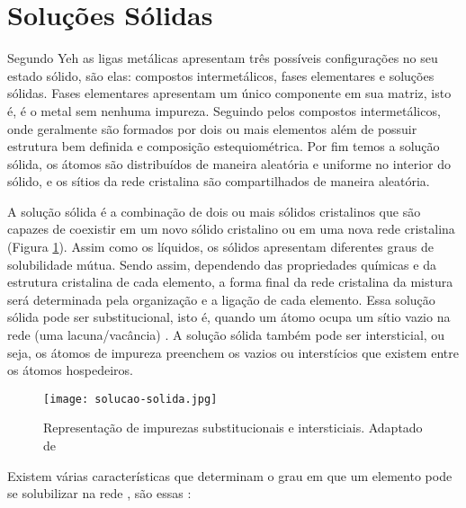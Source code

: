 \section{Soluções Sólidas}\label{sec:LABEL_CHP_1_SEC_A}


Segundo Yeh as ligas metálicas apresentam três possíveis configurações no seu estado sólido, são elas: compostos intermetálicos, fases elementares e soluções sólidas. Fases elementares apresentam um único componente em sua matriz, isto é, é o metal sem nenhuma impureza. Seguindo pelos compostos intermetálicos, onde geralmente são formados por dois ou mais elementos além de possuir estrutura bem definida e composição estequiométrica. Por fim temos a solução sólida, os átomos são distribuídos de maneira aleatória e uniforme no interior do sólido, e os sítios da rede cristalina são compartilhados de maneira aleatória. \cite{yeh2013alloy}

A solução sólida é a combinação de dois ou mais sólidos cristalinos que são capazes de coexistir em um novo sólido cristalino ou em uma nova rede cristalina (Figura \ref{fig:solucao-solida}). Assim como os líquidos, os sólidos apresentam diferentes graus de solubilidade mútua. Sendo assim, dependendo das propriedades químicas e da estrutura cristalina de cada elemento, a forma final da rede cristalina da mistura será determinada pela organização e a ligação de cada elemento. Essa solução sólida pode ser substitucional, isto é, quando um átomo ocupa um sítio vazio na rede (uma lacuna/vacância) \cite{britannicaSS}. A solução sólida também pode ser intersticial, ou seja, os átomos de impureza preenchem os vazios ou interstícios que existem entre os átomos hospedeiros.

\begin{figure}[ht]
    \centering
    
    \texttt{[image: solucao-solida.jpg]}
    \caption{Representação de impurezas substitucionais e intersticiais. Adaptado de \cite{callister2011materials}}
    \label{fig:solucao-solida}
\end{figure}

\pagebreak

Existem várias características que determinam o grau em que um elemento pode se solubilizar na rede \cite{callister2011materials}, são essas : 

